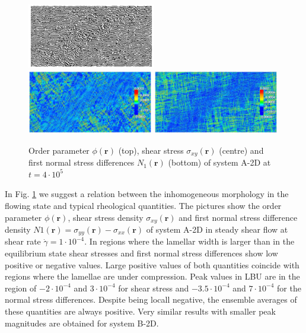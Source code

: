 \documentclass[8.5pt,twoside,twocolumn]{article}
\newcommand{\e}[1]{\cdot10^{#1}}
\begin{document}
\begin{figure}[htp]
\centering
\hspace*{-0.1cm}\includegraphics[angle=0,width=0.5\textwidth]{phi_run704_400.jpg}
\includegraphics[angle=0,width=0.49\textwidth]{shear_str_run704_400.jpg}
\includegraphics[angle=0,width=0.49\textwidth]{N1_run704_400.jpg}
\caption{Order parameter $\phi({\mathbf r})$ (top), shear stress $\sigma_{xy}({\mathbf r})$ (centre) and first normal stress differences $N_1({\mathbf r})$ (bottom) of system A-2D at $t=4\e{5}$}
\label{fig4}
\end{figure}

In Fig. \ref{fig4} we suggest a relation between the inhomogeneous morphology in the flowing state and typical rheological quantities.
The pictures show the order parameter $\phi({\bm r})$, shear stress density $\sigma_{xy}({\bm r})$ and first normal stress difference density $N1({\bm r})=\sigma_{yy}({\bm r})-\sigma_{xx}({\bm r})$ of system A-2D in steady shear flow at shear rate $\dot{\gamma}=1\e{-4}$.
In regions where the lamellar width is larger than in the equilibrium state shear stresses and first normal stress differences show low positive or negative values.
Large positive values of both quantities coincide with regions where the lamellae are under compression.
Peak values in LBU are in the region of $-2\e{-4}$ and $3\e{-4}$ for shear stress and  $-3.5\e{-4}$ and $7\e{-4}$ for the normal stress differences.
Despite being locall negative, the ensemble averages of these quantities are always positive.
Very similar results with smaller peak magnitudes are obtained for system B-2D.
\end{document}
